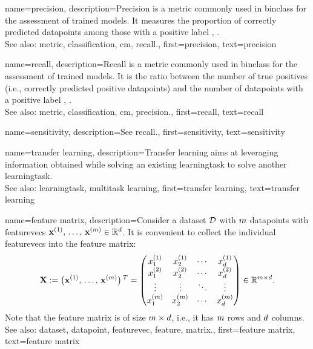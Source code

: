 {name={precision}, 
	description={Precision is a \gls{metric} commonly used in \gls{binclass} for 
		the assessment of trained \glspl{model}. It measures the proportion of correctly 
		predicted \glspl{datapoint} among those with a positive \gls{label} 
		\cite{Juba_Le_2019}, \cite{Rijsbergen1979}.
		\\
		See also: \gls{metric}, \gls{classification}, \gls{cm}, \gls{recall}.},
	first={precision}, 
	text={precision}
}

{name={recall}, 
	description={Recall is a \gls{metric} commonly used in \gls{binclass} for 
		the assessment of trained \glspl{model}. It is the ratio between the number of 
		true positives (i.e., correctly predicted positive \glspl{datapoint}) and the number 
		of \glspl{datapoint} with a positive \gls{label} \cite{Juba_Le_2019}, \cite{Rijsbergen1979}.
		\\ 
		See also: \gls{metric}, \gls{classification}, \gls{cm}, \gls{precision}.},
	first={recall}, 
	text={recall}
}

{name={sensitivity}, 
	description={See \gls{recall}.},
	first={sensitivity}, 
	text={sensitivity}
}

{name={transfer learning},
	description={Transfer learning aims at leveraging information 
		obtained while solving an existing \gls{learningtask} to 
   		solve another \gls{learningtask}.
		\\ 
   		See also: \gls{learningtask}, \gls{multitask learning}},
  	first={transfer learning},
  	text={transfer learning}
}

{name={feature matrix}, 
	description={Consider a \gls{dataset} $\mathcal{D}$ 
		with $m$ \glspl{datapoint} with \glspl{featurevec} 
		${\bf x}^{(1)}, \,\ldots, \,{\bf x}^{(m)} \in \mathbb{R}^{d}$. 
		It is convenient to collect the individual \glspl{featurevec} into 
		the \gls{feature} \gls{matrix}:
		$${\bf X} := \big({\bf x}^{(1)}, \,\ldots, \,{\bf x}^{(m)}\big)\,^{T} =
		\begin{pmatrix}
			x^{(1)}_{1} & x^{(1)}_{2} & \cdots & x^{(1)}_{d} \\
			x^{(2)}_{1} & x^{(2)}_{2} & \cdots & x^{(2)}_{d} \\
			\vdots      & \vdots      & \ddots & \vdots \\
			x^{(m)}_{1} & x^{(m)}_{2} & \cdots & x^{(m)}_{d}
		\end{pmatrix}
		\in \mathbb{R}^{m \times d}.$$
		Note that the \gls{feature} \gls{matrix} is of size $m \times d$, i.e., 
		it has $m$ rows and $d$ columns.
				\\
		See also: \gls{dataset}, \gls{datapoint}, \gls{featurevec}, \gls{feature}, \gls{matrix}.},
	first={feature matrix},
	text={feature matrix} 
}


